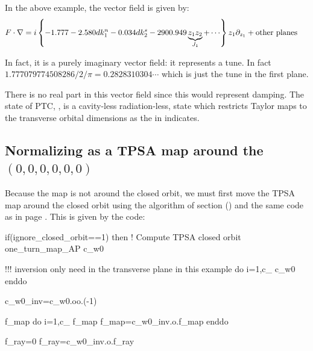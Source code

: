 \documentclass{hitec}     %
\begin{document}
{{{{{{ 
 
In the above  example, the vector field is given by:
%
\begin{align} F\cdot \nabla &= i\left\{{-1.777-2.580d{k}_{1}^{n}- 0.034d{k}_{2}^{s}-2900.949\underbrace{{z}_{1}{z}_{2}}\limits_{{J}_{1}}^{}+\cdots}\right\}{z}_{1}{\partial }_{{z}_{1}}+{\rm o}{\rm t}{\rm h}{\rm e}{\rm r}~{\rm p}{\rm l}{\rm a}{\rm n}{\rm e}{\rm s}~\label{eq:vfk1} \end{align}

In fact, it is a purely imaginary vector field: it represents a tune. In fact $1.777079774508286/2/\pi=0.2828310304\cdots$ which is just the tune in the first plane.

There is no real part in this vector field since this would represent damping. The state of PTC,  , is a cavity-less radiation-less, state which restricts Taylor maps to the transverse orbital dimensions as the  in  indicates.


 \subsection{Normalizing as a TPSA map around the  $(0,0,0,0,0,0)$}\label{s:normtpsa}
 
 Because the map is not around the closed orbit, we must first move the TPSA map around the closed orbit using the algorithm of section () and the same code as in page \pageref{p:tpage}.  
 This is given by the code:
 
  
\begin{code}
if(ignore_closed_orbit==1) then
!   Compute TPSA closed orbit
one_turn_map_AP%
c_w0%

!!! inversion only need in the transverse plane in this example
do i=1,c_%
 c_w0%
enddo
 
 c_w0_inv=c_w0.oo.(-1)

f_map%
do i=1,c_%
f_map%
f_map=c_w0_inv.o.f_map
enddo

f_ray=0
f_ray=c_w0_inv.o.f_ray
 

\end{code}}}}}}}
\end{document}
